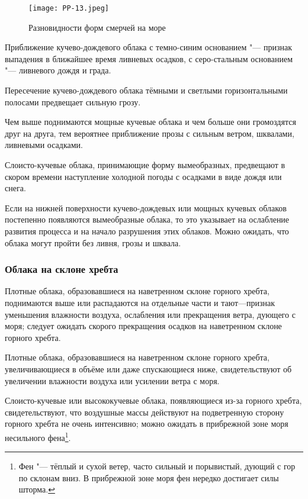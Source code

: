 \begin{figure}[htb]
  \centering{}
  \texttt{[image: PP-13.jpeg]}
  \caption{Разновидности форм смерчей на море}
  \label{fig:pp13}
  \small
  \centering{}
\end{figure}

 Приближение кучево-дождевого облака с темно-синим основанием "---
признак выпадения в ближайшее время ливневых осадков, с серо-стальным
основанием "--- ливневого дождя и града.

 Пересечение кучево-дождевого облака тёмными и светлыми
горизонтальными полосами предвещает сильную грозу.

 Чем выше поднимаются мощные кучевые облака и чем больше они
громоздятся друг на друга, тем вероятнее приближение прозы с сильным
ветром, шквалами, ливневыми осадками.

 Слоисто-кучевые облака, принимающие форму вымеобразных,
предвещают в скором времени наступление холодной погоды с осадками в
виде дождя или снега.

 Если на нижней поверхности кучево-дождевых или мощных кучевых
облаков постепенно появляются вымеобразные облака, то это указывает на
ослабление развития процесса и на начало разрушения этих
облаков. Можно ожидать, что облака могут пройти без ливня, грозы и
шквала.

\subsubsection{Облака на склоне хребта}

 Плотные облака, образовавшиеся на наветренном склоне горного
хребта, поднимаются выше или распадаются на отдельные части и
тают—признак уменьшения влажности воздуха, ослабления или прекращения
ветра, дующего с моря; следует ожидать скорого прекращения осадков на
наветренном склоне горного хребта.

 Плотные облака, образовавшиеся на наветренном склоне горного
хребта, увеличивающиеся в объёме или даже спускающиеся ниже,
свидетельствуют об увеличении влажности воздуха или усилении ветра с
моря.

 Слоисто-кучевые или высококучевые облака, появляющиеся из-за
горного хребта, свидетельствуют, что воздушные массы действуют на
подветренную сторону горного хребта не очень интенсивно; можно ожидать
в прибрежной зоне моря несильного фена\footnote{Фен "--- тёплый и
  сухой ветер, часто сильный и порывистый, дующий с гор по склонам
  вниз. В прибрежной зоне моря фен нередко достигает силы шторма.}.

